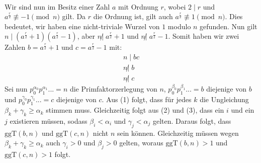 \paragraph{}

Wir sind nun im Besitz einer Zahl $a$ mit Ordnung $r$, wobei $2 \mid r$ und $a^\frac{r}{2} \not\equiv -1 \pmod{n}$ gilt. Da $r$ die Ordnung ist, gilt auch $a^\frac{r}{2} \not\equiv 1 \pmod{n}$. Dies bedeutet, wir haben eine nicht-triviale Wurzel von $1$ modulo $n$ gefunden. Nun gilt $n \mid (a^\frac{r}{2} + 1)(a^\frac{r}{2} - 1)$, aber $n \not| \; a^\frac{r}{2} + 1$ und $n \not| \; a^\frac{r}{2} - 1$. Somit haben wir zwei Zahlen $b = a^\frac{r}{2} + 1$ und $c = a^\frac{r}{2} - 1$ mit:
\begin{align}
    n \mid bc \label{eq:1} \\
    n \not| \; b \label{eq:2} \\
    n \not| \; c \label{eq:3}
\end{align}    
Sei nun $p_0^{\alpha_0}p_1^{\alpha_1}... = n$ die Primfaktorzerlegung von $n$, $p_0^{\beta_0}p_1^{\beta_1}... = b$ diejenige von $b$ und $p_0^{\gamma_0}p_1^{\gamma_1}... = c$ diejenige von $c$. Aus (1) folgt, dass für jedes $k$ die Ungleichung $\beta_k + \gamma_k \geq \alpha_k$ stimmen muss. Gleichzeitig folgt aus (2) und (3), dass ein $i$ und ein $j$ existieren müssen, sodass $\beta_i < \alpha_i$ und $\gamma_j < \alpha_j$ gelten. Daraus folgt, dass $\text{ggT}(b, n)$ und $\text{ggT}(c, n)$ nicht $n$ sein können. Gleichzeitig müssen wegen $\beta_k + \gamma_k \geq \alpha_k$ auch $\gamma_i > 0$ und $\beta_j > 0$ gelten, woraus $\text{ggT}(b, n) > 1$ und $\text{ggT}(c, n) > 1$ folgt.
